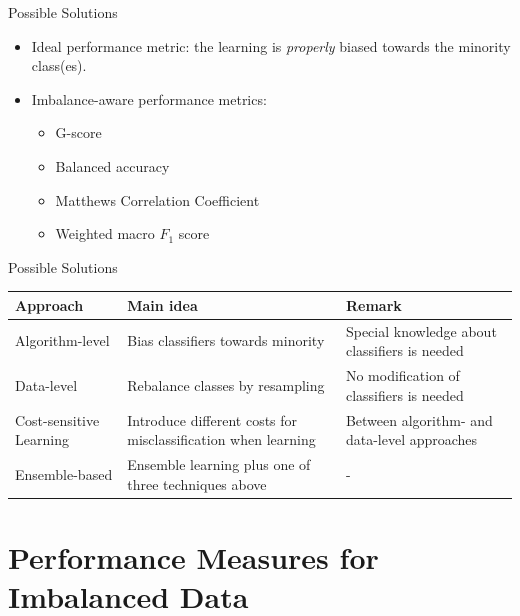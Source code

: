 \documentclass[10pt,compress,t,notes=noshow, xcolor=table]{beamer}
\begin{document}
\begin{frame}{Possible Solutions}
	\begin{itemize}
        
		\item Ideal performance metric: the learning is \emph{properly} biased towards the minority class(es).	

        \item Imbalance-aware performance metrics:
        \begin{itemize}
            \item G-score
            \item Balanced accuracy
            \item Matthews Correlation Coefficient
            \item Weighted macro $F_1$ score
        \end{itemize}
	\end{itemize}
\end{frame} 


\begin{frame}{Possible Solutions}
\begin{table}[h]
\footnotesize
    \centering
    \begin{tabular}{p{} p{} p{}}
        \toprule
        \textbf{Approach} & \textbf{Main idea} & \textbf{Remark} \\ [5pt]
        \hline
        Algorithm-level & Bias classifiers towards minority & Special knowledge about classifiers is needed \\ [5pt]
        \hline
        Data-level & Rebalance classes by resampling & No modification of classifiers is needed \\ [5pt]
        \hline
        Cost-sensitive Learning & Introduce different costs for misclassification when learning & Between algorithm- and data-level approaches \\ [15pt]
        \hline
        Ensemble-based & Ensemble learning plus one of three techniques above & - \\ [5pt]
        \bottomrule
    \end{tabular}
\end{table}

\end{frame}


\section{Performance Measures for Imbalanced Data}
\end{document}
